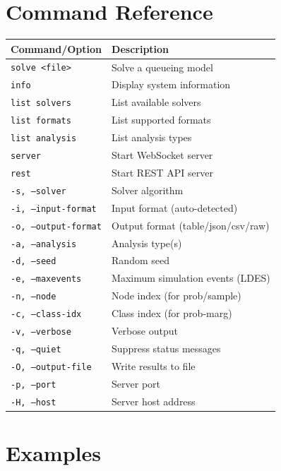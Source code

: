 \section{Command Reference}
\label{cli-command-reference}

\begin{center}
\begin{tabular}{|l|l|}
\hline
\textbf{Command/Option} & \textbf{Description} \\
\hline
\texttt{solve <file>} & Solve a queueing model \\
\texttt{info} & Display system information \\
\texttt{list solvers} & List available solvers \\
\texttt{list formats} & List supported formats \\
\texttt{list analysis} & List analysis types \\
\texttt{server} & Start WebSocket server \\
\texttt{rest} & Start REST API server \\
\hline
\texttt{-s, --solver} & Solver algorithm \\
\texttt{-i, --input-format} & Input format (auto-detected) \\
\texttt{-o, --output-format} & Output format (table/json/csv/raw) \\
\texttt{-a, --analysis} & Analysis type(s) \\
\texttt{-d, --seed} & Random seed \\
\texttt{-e, --maxevents} & Maximum simulation events (LDES) \\
\texttt{-n, --node} & Node index (for prob/sample) \\
\texttt{-c, --class-idx} & Class index (for prob-marg) \\
\texttt{-v, --verbose} & Verbose output \\
\texttt{-q, --quiet} & Suppress status messages \\
\texttt{-O, --output-file} & Write results to file \\
\texttt{-p, --port} & Server port \\
\texttt{-H, --host} & Server host address \\
\hline
\end{tabular}
\end{center}

\section{Examples}
\label{cli-examples}

